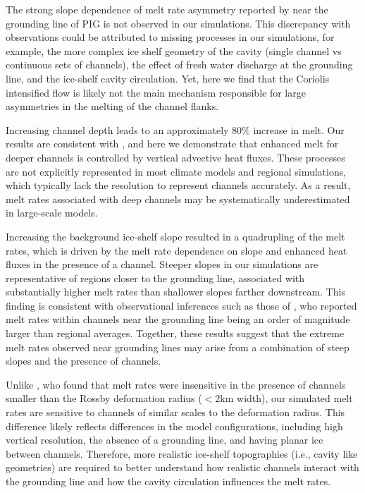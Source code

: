 \documentclass[draft]{agujournal2019}
\begin{document}
The strong slope dependence of melt rate asymmetry reported by \citet{Lowery_PIG_2025} near the grounding line of PIG is not observed in our simulations. This discrepancy with observations could be attributed to missing processes in our simulations, for example, the more complex ice shelf geometry of the cavity (single channel vs continuous sets of channels), the effect of fresh water discharge at the grounding line, and the ice-shelf cavity circulation. Yet, here we find that the Coriolis intensified flow is likely not the main mechanism responsible for large asymmetries in the melting of the channel flanks.

Increasing channel depth leads to an approximately $80\%$ increase in melt. Our results are consistent with \citet{Cheng_Channel_2024}, and here we demonstrate that enhanced melt for deeper channels is controlled by vertical advective heat fluxes.
These processes are not explicitly represented in most climate models and regional simulations, which typically lack the resolution to represent channels accurately. As a result, melt rates associated with deep channels may be systematically underestimated in large-scale models.

Increasing the background ice-shelf slope resulted in a quadrupling of the melt rates, which is driven by the melt rate dependence on slope \citep{Anselin_IceBase_2024} and enhanced heat fluxes in the presence of a channel. Steeper slopes in our simulations are representative of regions closer to the grounding line, associated with substantially higher melt rates than shallower slopes farther downstream. This finding is consistent with observational inferences such as those of \citet{Shean_IceShelf_2019, Dutrieux_PineIsland_2013}, who reported melt rates within channels near the grounding line being an order of magnitude larger than regional averages. Together, these results suggest that the extreme melt rates observed near grounding lines may arise from a combination of steep slopes and the presence of channels. 

Unlike \citet{Millgate_BasalChannels_2013}, who found that melt rates were insensitive in the presence of channels smaller than the Rossby deformation radius ($<2\mathrm{km}$ width), our simulated melt rates are sensitive to channels of similar scales to the deformation radius. This difference likely reflects differences in the model configurations, including high vertical resolution, the absence of a grounding line, and having planar ice between channels. Therefore, more realistic ice-shelf topographies (i.e., cavity like geometries) are required to better understand how realistic channels interact with the grounding line and how the cavity circulation influences the melt rates.
\end{document}
